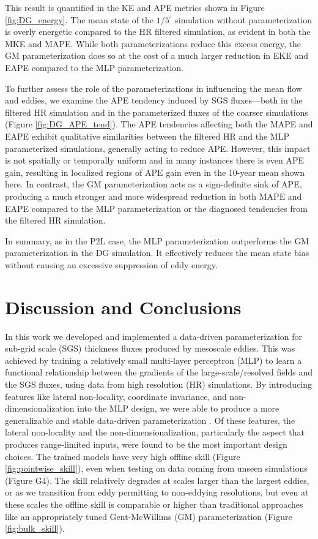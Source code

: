 \documentclass[draft]{agujournal2019}
\begin{document}
This result is quantified in the KE and APE metrics shown in Figure \ref{fig:DG_energy}. The mean state of the $1/5^\circ$ simulation without parameterization is overly energetic compared to the HR filtered simulation, as evident in both the MKE and MAPE. While both parameterizations reduce this excess energy, the GM parameterization does so at the cost of a much larger reduction in EKE and EAPE compared to the MLP parameterization.

To further assess the role of the parameterizations in influencing the mean flow and eddies, we examine the APE tendency induced by SGS fluxes—both in the filtered HR simulation and in the parameterized fluxes of the coarser simulations (Figure \ref{fig:DG_APE_tend}). The APE tendencies affecting both the MAPE and EAPE exhibit qualitative similarities between the filtered HR and the MLP parameterized simulations, generally acting to reduce APE. However, this impact is not spatially or temporally uniform and in many instances there is even APE gain, resulting in localized regions of APE gain even in the 10-year mean shown here.
In contrast, the GM parameterization acts as a sign-definite sink of APE, producing a much stronger and more widespread reduction in both MAPE and EAPE compared to the MLP parameterization or the diagnosed tendencies from the filtered HR simulation.


In summary, as in the P2L case, the MLP parameterization outperforms the GM parameterization in the DG simulation. It effectively reduces the mean state bias without causing an excessive suppression of eddy energy.



\section{Discussion and Conclusions}
In this work we developed and implemented a data-driven parameterization for sub-grid scale (SGS) thickness fluxes produced by mesoscale eddies. This was achieved by training a relatively small multi-layer perceptron (MLP) to learn a functional relationship between the gradients of the large-scale/resolved fields and the SGS fluxes, using data from high resolution (HR) simulations. By introducing features like lateral non-locality, coordinate invariance, and non-dimensionalization into the MLP design, we were able to produce a more generalizable and stable data-driven parameterization \cite{perezhogin2025generalizable}. 
Of these features, the lateral non-locality and the non-dimensionalization, particularly the aspect that produces range-limited inputs, were found to be the most important design choices.
The trained models have very high offline skill (Figure \ref{fig:pointwise_skill}), even when testing on data coming from unseen simulations (Figure G4). The skill relatively degrades at scales larger than the largest eddies, or as we transition from eddy permitting to non-eddying resolutions, but even at these scales the offline skill is comparable or higher than traditional approaches like an appropriately tuned Gent-McWillims (GM) parameterization (Figure \ref{fig:bulk_skill}).
\end{document}
